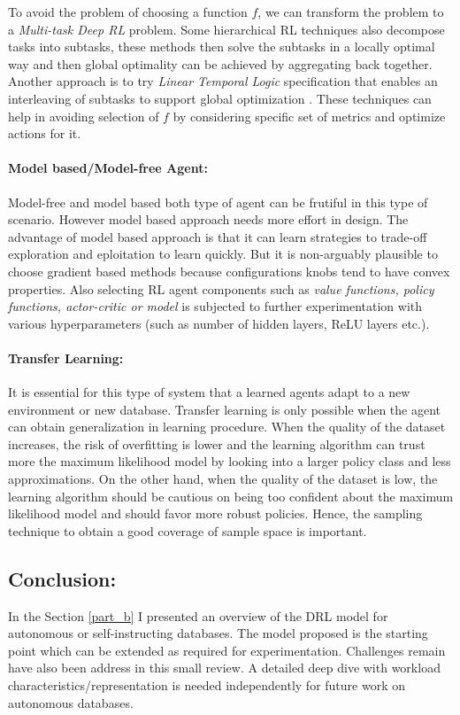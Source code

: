 To avoid the problem of choosing a function $f$, we can transform the problem to a {\em Multi-task Deep RL} problem.
Some hierarchical RL techniques also decompose tasks into subtasks, these methods then solve the subtasks
in a locally optimal way and then global optimality can be achieved by aggregating back together. Another approach is to try {\em Linear Temporal Logic} specification that enables an interleaving of subtasks to support global optimization \cite{icarte2018teaching}.
These techniques can help in avoiding selection of $f$ by considering specific set of metrics and optimize actions for it.


\paragraph{Model based/Model-free Agent:}
Model-free and model based both type of agent can be frutiful in this type of scenario. However model based approach needs more effort in design.
The advantage of model based approach is that it can learn strategies to trade-off exploration and eploitation to learn quickly.
But it is non-arguably plausible to choose gradient based methods because configurations knobs tend to have convex properties.
Also selecting RL agent components such as {\em value functions, policy functions, actor-critic or model} is subjected to further experimentation with various hyperparameters (such as number of hidden layers, ReLU layers etc.).

\paragraph{Transfer Learning:}
It is essential for this type of system that a learned agents adapt to a new environment or new database.
Transfer learning is only possible when the agent can obtain generalization in learning procedure.
When the quality
of the dataset increases, the risk of overfitting is lower and the learning
algorithm can trust more the maximum likelihood model by looking
into a larger policy class and less approximations.
On the other hand, when the quality of the dataset is low, the learning algorithm should be
cautious on being too confident about the maximum likelihood model
and should favor more robust policies. Hence, the sampling technique to obtain a good coverage of sample space is important.


\subsection{Conclusion:}
In the Section \ref{part_b} I presented an overview of the DRL model for autonomous or self-instructing databases. The model proposed is the starting point which can be extended as required for experimentation.  Challenges remain have also been address in this small review.
A detailed deep dive with workload characteristics/representation is needed independently for future work on autonomous databases.








